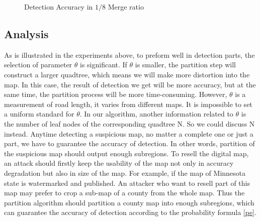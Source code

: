 \begin{figure}[h]
\centering
{}
\caption{Detection Accuracy in $1/8$ Merge ratio}
\label{fig:deltamerge}
\end{figure}



\subsection{Analysis}

As is illustrated in the experiments above, to preform well in detection parts, 
the selection of parameter $\theta$ is significant. If $\theta$ is smaller, the partition
step will construct a larger quadtree, which means we will make more distortion
 into the map. In this case, the result of detection we get will be more accuracy,
but at the same time, the partition process will be more time-consuming. However, $\theta$
is a measurement of road length, it varies from different maps. It is impossible to
set a uniform standard for $\theta $. In our algorithm, another information related to 
$\theta$ is the number of leaf nodes of the corresponding quadtree N. So we could discuss
N instead. Anytime detecting a suspicious map, no matter a complete one or just a part, 
we have to guarantee the accuracy of detection. In other words, partition of the 
suspicious map should output enough subregions. To resell the digital map, an attack 
should firstly keep the usability of the map not only in accuracy degradation but
also in size of the map. For example, if the map of Minnesota state is watermarked
and published. An attacker who want to resell part of this map may prefer to crop a 
sub-map of a county from the whole map. Thus the partition algorithm should partition 
a county map into enough subregions, which can guarantee the accuracy of detection according 
to the probability formula \ref{pe}.



